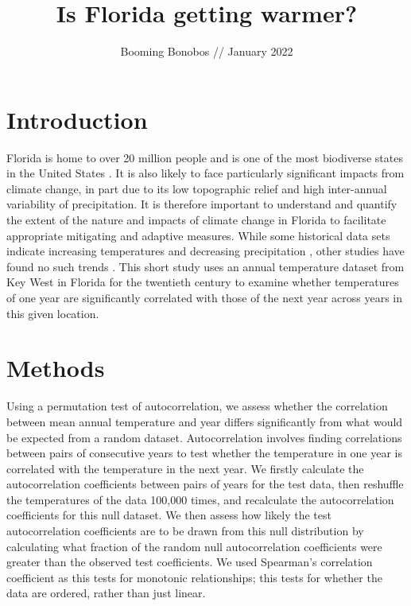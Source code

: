 \documentclass{article}
\title{\textbf{Is Florida getting warmer?\vspace{-0.5em}}}
\author{Booming Bonobos // January 2022}
\date{}
\begin{document}
\maketitle

\section{Introduction \vspace{-0.5em}}

    Florida is home to over 20 million people and is one of the most biodiverse states in the United States \cite{usda}. It is also likely to face particularly significant impacts from climate change, in part due to its low topographic relief and high inter-annual variability of precipitation. It is therefore important to understand and quantify the extent of the nature and impacts of climate change in Florida to facilitate appropriate mitigating and adaptive measures. While some historical data sets indicate increasing temperatures and decreasing precipitation \cite{irizarry2013historical}, other studies have found no such trends \cite{obeysekera2011climate}. This short study uses an annual temperature dataset from Key West in Florida for the twentieth century to examine whether temperatures of one year are significantly correlated with those of the next year across years in this given location. \vspace{-1em}

\section{Methods \vspace{-0.5em}}

Using a permutation test of autocorrelation, we assess whether the correlation between mean annual temperature and year differs significantly from what would be expected from a random dataset. Autocorrelation involves finding correlations between pairs of consecutive years to test whether the temperature in one year is correlated with the temperature in the next year. We firstly calculate the autocorrelation coefficients between pairs of years for the test data, then reshuffle the temperatures of the data 100,000 times, and recalculate the autocorrelation coefficients for this null dataset. We then assess how likely the test autocorrelation coefficients are to be drawn from this null distribution by calculating what fraction of the random null autocorrelation coefficients were greater than the observed test coefficients. We used Spearman's correlation coefficient as this tests for monotonic relationships; this tests for whether the data are ordered, rather than just linear. \vspace{-1em}
\end{document}
